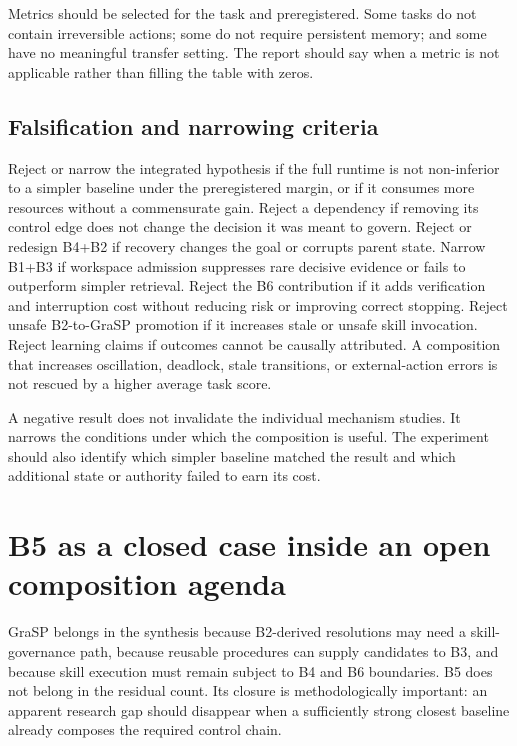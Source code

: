 Metrics should be selected for the task and preregistered. Some tasks do not contain irreversible actions; some do not require persistent memory; and some have no meaningful transfer setting. The report should say when a metric is not applicable rather than filling the table with zeros.

\subsection{Falsification and narrowing criteria}
\label{subsec:ch18-falsification}

Reject or narrow the integrated hypothesis if the full runtime is not non-inferior to a simpler baseline under the preregistered margin, or if it consumes more resources without a commensurate gain. Reject a dependency if removing its control edge does not change the decision it was meant to govern. Reject or redesign B4+B2 if recovery changes the goal or corrupts parent state. Narrow B1+B3 if workspace admission suppresses rare decisive evidence or fails to outperform simpler retrieval. Reject the B6 contribution if it adds verification and interruption cost without reducing risk or improving correct stopping. Reject unsafe B2-to-GraSP promotion if it increases stale or unsafe skill invocation. Reject learning claims if outcomes cannot be causally attributed. A composition that increases oscillation, deadlock, stale transitions, or external-action errors is not rescued by a higher average task score.

A negative result does not invalidate the individual mechanism studies. It narrows the conditions under which the composition is useful. The experiment should also identify which simpler baseline matched the result and which additional state or authority failed to earn its cost.

\section{B5 as a closed case inside an open composition agenda}

GraSP belongs in the synthesis because B2-derived resolutions may need a skill-governance path, because reusable procedures can supply candidates to B3, and because skill execution must remain subject to B4 and B6 boundaries. B5 does not belong in the residual count. Its closure is methodologically important: an apparent research gap should disappear when a sufficiently strong closest baseline already composes the required control chain.

